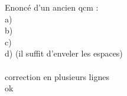 {%
Enoncé d'un ancien qcm :\\
a)\\
b)\\
c)\\
d) (il suffit d'enveler les espaces)\\
~\\
}
{%
correction en plusieurs lignes\\
ok\\
~\\
}
